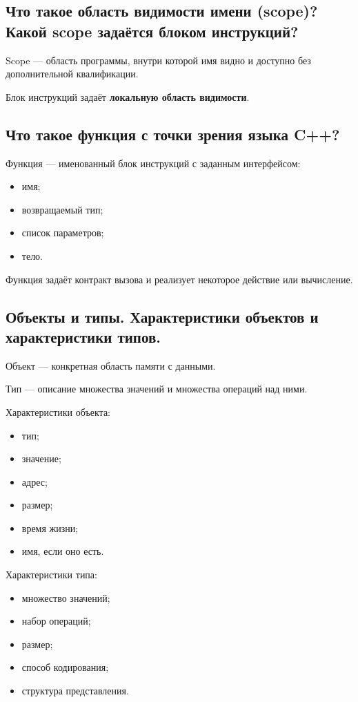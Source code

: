 \subsection{Что такое область видимости имени (scope)? Какой scope задаётся блоком инструкций?}

Scope --- область программы, внутри которой имя видно и доступно без дополнительной квалификации.

Блок инструкций задаёт \textbf{локальную область видимости}.


\subsection{Что такое функция с точки зрения языка C++?}

Функция --- именованный блок инструкций с заданным интерфейсом:
\begin{itemize}
    \item имя;
    \item возвращаемый тип;
    \item список параметров;
    \item тело.
\end{itemize}

Функция задаёт контракт вызова и реализует некоторое действие или вычисление.


\subsection{Объекты и типы. Характеристики объектов и характеристики типов.}

Объект --- конкретная область памяти с данными.

Тип --- описание множества значений и множества операций над ними.

Характеристики объекта:
\begin{itemize}
    \item тип;
    \item значение;
    \item адрес;
    \item размер;
    \item время жизни;
    \item имя, если оно есть.
\end{itemize}

Характеристики типа:
\begin{itemize}
    \item множество значений;
    \item набор операций;
    \item размер;
    \item способ кодирования;
    \item структура представления.
\end{itemize}


